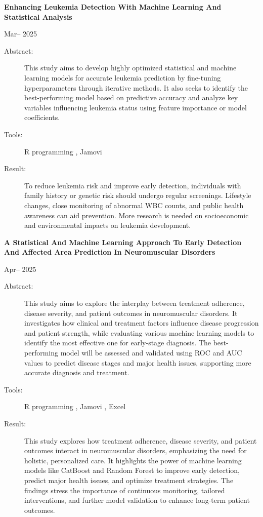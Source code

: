 \documentclass[a4paper,11pt]{article}
\begin{document}
	\vspace{12pt}
		\textbf{Enhancing Leukemia Detection With Machine Learning And Statistical Analysis}
		\begin{flushright}
			\hfill Mar-- 2025 \\
		\end{flushright}
	\begin{description}
		\item[Abstract:] This study aims to develop highly optimized statistical and machine learning models for accurate leukemia prediction by fine-tuning hyperparameters through iterative methods. It also seeks to identify the best-performing model based on predictive accuracy and analyze key variables influencing leukemia status using feature importance or model coefficients.
		\item[Tools:] R programming , Jamovi 
		\item[Result:] To reduce leukemia risk and improve early detection, individuals with family history or genetic risk should undergo regular screenings. Lifestyle changes, close monitoring of abnormal WBC counts, and public health awareness can aid prevention. More research is needed on socioeconomic and environmental impacts on leukemia development.
		
		
	\end{description}
	
	\vspace{12pt}
	\textbf{A Statistical And Machine Learning Approach To Early Detection And Affected Area Prediction In Neuromuscular Disorders }
	\begin{flushright}
		\hfill Apr-- 2025 \\
	\end{flushright}
	\begin{description}
		\item[Abstract:] This study aims to explore the interplay between treatment adherence, disease severity, and patient outcomes in neuromuscular disorders. It investigates how clinical and treatment factors influence disease progression and patient strength, while evaluating various machine learning models to identify the most effective one for early-stage diagnosis. The best-performing model will be assessed and validated using ROC and AUC values to predict disease stages and major health issues, supporting more accurate diagnosis and treatment.
		\item[Tools:] R programming , Jamovi , Excel 
		\item[Result:] This study explores how treatment adherence, disease severity, and patient outcomes interact in neuromuscular disorders, emphasizing the need for holistic, personalized care. It highlights the power of machine learning models like CatBoost and Random Forest to improve early detection, predict major health issues, and optimize treatment strategies. The findings stress the importance of continuous monitoring, tailored interventions, and further model validation to enhance long-term patient outcomes.
		
		
		
	\end{description}
\end{document}

